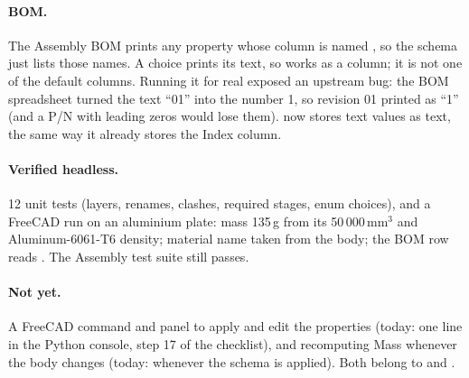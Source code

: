 \paragraph{BOM.} The Assembly BOM prints any property whose column is named , so the schema
just lists those names. A choice prints its text, so  works as a column; it is not one of the
default columns. Running it for real exposed an upstream bug: the BOM spreadsheet turned the text
``01'' into the number 1, so revision 01 printed as ``1'' (and a P/N with leading zeros would lose them).
 now stores text values as text, the same way it already stores the Index column.

\paragraph{Verified headless.} 12 unit tests (layers, renames, clashes, required stages, enum choices), and a
FreeCAD run on an aluminium plate: mass 135\,g from its 50\,000\,mm$^3$ and Aluminum-6061-T6 density; material
name taken from the body; the BOM row reads . The Assembly test suite still passes.

\paragraph{Not yet.} A FreeCAD command and panel to apply and edit the properties (today: one line in the Python
console, step 17 of the checklist), and recomputing Mass whenever the body changes (today: whenever the schema is
applied). Both belong to  and .
